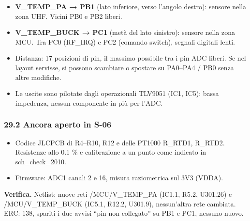 \begin{itemize}
\item \textbf{V\_\allowbreak{}TEMP\_\allowbreak{}PA → PB1} (lato inferiore, verso l'angolo destro): sensore nella zona UHF. Vicini PB0 e PB2 liberi.
\item \textbf{V\_\allowbreak{}TEMP\_\allowbreak{}BUCK → PC1} (metà del lato sinistro): sensore nella zona MCU. Tra PC0 (RF\_\allowbreak{}IRQ) e PC2 (comando switch), segnali digitali lenti.
\item Distanza: 17 posizioni di pin, il massimo possibile tra i pin ADC liberi. Se nel layout servisse, si possono scambiare o spostare su PA0–PA4 /\allowbreak{} PB0 senza altre modifiche.
\item Le uscite sono pilotate dagli operazionali TLV9051 (IC1, IC5): bassa impedenza, nessun componente in più per l'ADC.
\end{itemize}

\subsubsection[29.2 Ancora aperto in S-06]{29.2 Ancora aperto in S-06}

\begin{itemize}
\item Codice JLCPCB di R4–R10, R12 e delle PT1000 R\_\allowbreak{}RTD1, R\_\allowbreak{}RTD2. Resistenze allo 0.1 \% e calibrazione a un punto come indicato in sch\_\allowbreak{}check\_\allowbreak{}2010.
\item Firmware: ADC1 canali 2 e 16, misura raziometrica sul 3V3 (VDDA).
\end{itemize}

\textbf{Verifica.} Netlist: nuove reti /\allowbreak{}MCU/\allowbreak{}V\_\allowbreak{}TEMP\_\allowbreak{}PA (IC1.1, R5.2, U301.26) e /\allowbreak{}MCU/\allowbreak{}V\_\allowbreak{}TEMP\_\allowbreak{}BUCK (IC5.1, R12.2, U301.9), nessun'altra rete cambiata. ERC: 138, spariti i due avvisi \textquotedblleft{}pin non collegato\textquotedblright{} su PB1 e PC1, nessuno nuovo.
